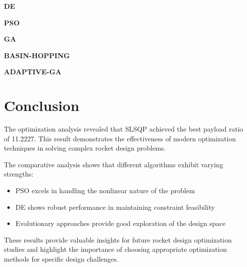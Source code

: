 \documentclass[11pt]{article}
\begin{document}
\item \textbf{DE}
\begin{itemize}
\end{itemize}
\item \textbf{PSO}
\begin{itemize}
\end{itemize}
\item \textbf{GA}
\begin{itemize}
\end{itemize}
\item \textbf{BASIN-HOPPING}
\begin{itemize}
\end{itemize}
\item \textbf{ADAPTIVE-GA}
\begin{itemize}
\end{itemize}

\section{Conclusion}
The optimization analysis revealed that SLSQP achieved the best payload ratio of 11.2227. This result demonstrates the effectiveness of modern optimization techniques in solving complex rocket design problems.

The comparative analysis shows that different algorithms exhibit varying strengths:
\begin{itemize}
    \item PSO excels in handling the nonlinear nature of the problem \cite{pso_ascent_2013}
    \item DE shows robust performance in maintaining constraint feasibility \cite{de_ascent_2021}
    \item Evolutionary approaches provide good exploration of the design space \cite{evolutionary_rocket_2022}
\end{itemize}

These results provide valuable insights for future rocket design optimization studies and highlight the importance of choosing appropriate optimization methods for specific design challenges.


\end{document}
